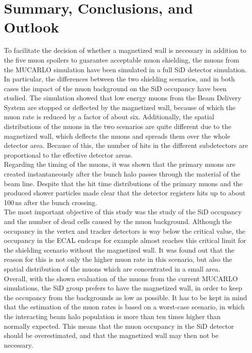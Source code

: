 \section{Summary, Conclusions, and Outlook}

To facilitate the decision of whether a magnetized wall is necessary in addition to the five muon spoilers to guarantee acceptable muon shielding, the muons from the MUCARLO simulation have been simulated in a full SiD detector simulation.
In particular, the differences between the two shielding scenarios, and in both cases the impact of the muon background on the SiD occupancy have been studied.
The simulation showed that low energy muons from the Beam Delivery System are stopped or deflected by the magnetized wall, because of which the muon rate is reduced by a factor of about six.
Additionally, the spatial distributions of the muons in the two scenarios are quite different due to the magnetized wall, which deflects the muons and spreads them over the whole detector area.
Because of this, the number of hits in the different subdetectors are proportional to the effective detector areas.\\
Regarding the timing of the muons, it was shown that the primary muons are created instantaneously after the bunch halo passes through the material of the beam line.
Despite that the hit time distributions of the primary muons and the produced shower particles made clear that the detector registers hits up to about \unit{100}\,{ns} after the bunch crossing.\\
The most important objective of this study was the study of the SiD occupancy and the number of dead cells caused by the muon background.
Although the occupancy in the vertex and tracker detectors is way below the critical value, the occupancy in the ECAL endcaps for example almost reaches this critical limit for the shielding scenario without the magnetized wall.
It was found out that the reason for this is not only the higher muon rate in this scenario, but also the spatial distribution of the muons which are concentrated in a small area.\\
Overall, with the shown evaluation of the muons from the current MUCARLO simulations, the SiD group prefers to have the magnetized wall, in order to keep the occupancy from the backgrounds as low as possible.
It has to be kept in mind that the estimation of the muon rates is based on a worst-case scenario, in which the interacting beam halo population is more than ten times higher than normally expected.
This means that the muon occupancy in the SiD detector should be overestimated, and that the magnetized wall may then not be necessary.
